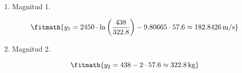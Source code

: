 \begin{enumerate}

\item Magnitud 1.

\[\fitmath{y_{1}=2450\cdot \ln\left(\frac{438}{322.8}\right)-9.80665\cdot 57.6\approx 182.8426\,\mathrm{m/s}}\]

\item Magnitud 2.

\[\fitmath{y_{2}=438-2\cdot 57.6\approx 322.8\,\mathrm{kg}}\]

\end{enumerate}
